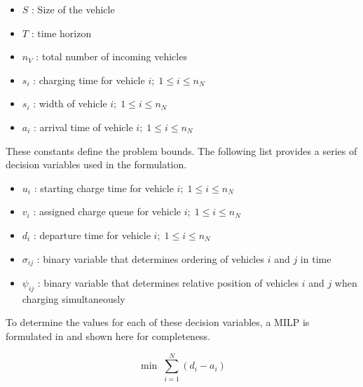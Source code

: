 \documentclass[ee,msthesis]{usuthesis}
\begin{document}
\begin{itemize}
	\item $S$   : Size of the vehicle
	\item $T$   : time horizon
	\item $n_V$ : total number of incoming vehicles
	\item $s_i$ : charging time for vehicle $i;\; 1 \leq i \leq n_N$
	\item $s_i$ : width of vehicle $i;\; 1 \leq i \leq n_N$
	\item $a_i$ : arrival time of vehicle $i;\; 1 \leq i \leq n_N$
\end{itemize}

These constants define the problem bounds. The following list provides a series of decision variables used in the
formulation.

\begin{itemize}
    \item $u_i$    : starting charge time for vehicle $i;\; 1 \leq i \leq n_N$
    \item $v_i$    : assigned charge queue for vehicle $i;\; 1 \leq i \leq n_N$
    \item $d_i$    : departure time for vehicle $i;\; 1 \leq i \leq n_N$
    \item $\sigma_{ij}$ : binary variable that determines ordering of vehicles $i$ and $j$ in time
    \item $\psi_{ij}$ : binary variable that determines relative position of vehicles $i$ and $j$ when charging simultaneously
\end{itemize}

To determine the values for each of these decision variables, a MILP is formulated in \cite{qarebagh-2019-optim-sched}
and shown here for completeness.

\begin{equation}
	\label{eq:bapobjective}
	\min\; \sum_{i=1}^N (d_i - a_i)
\end{equation}
\end{document}
